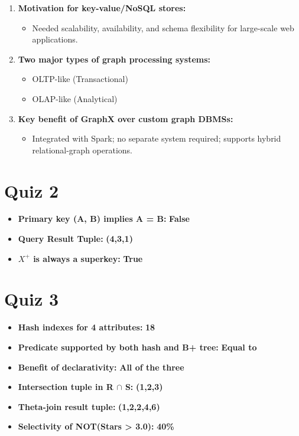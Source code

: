 \documentclass[12pt]{article}
\begin{document}
\begin{enumerate}
    \item \textbf{Motivation for key-value/NoSQL stores:}
    \begin{itemize}
        \item Needed scalability, availability, and schema flexibility for large-scale web applications.
    \end{itemize}

    \item \textbf{Two major types of graph processing systems:}
    \begin{itemize}
        \item OLTP-like (Transactional)
        \item OLAP-like (Analytical)
    \end{itemize}

    \item \textbf{Key benefit of GraphX over custom graph DBMSs:}
    \begin{itemize}
        \item Integrated with Spark; no separate system required; supports hybrid relational-graph operations.
    \end{itemize}
\end{enumerate}

\section*{Quiz 2}

\begin{itemize}
    \item \textbf{Primary key (A, B) implies A = B:} \textbf{False}
    \item \textbf{Query Result Tuple:} \textbf{(4,3,1)}
    \item \textbf{$X^{+}$ is always a superkey:} \textbf{True}
\end{itemize}

\section*{Quiz 3}

\begin{itemize}
    \item \textbf{Hash indexes for 4 attributes:} \textbf{18}
    \item \textbf{Predicate supported by both hash and B+ tree:} \textbf{Equal to}
    \item \textbf{Benefit of declarativity:} \textbf{All of the three}
    \item \textbf{Intersection tuple in R $\cap$ S:} \textbf{(1,2,3)}
    \item \textbf{Theta-join result tuple:} \textbf{(1,2,2,4,6)}
    \item \textbf{Selectivity of NOT(Stars > 3.0):} \textbf{40\%}
\end{itemize}
\end{document}
